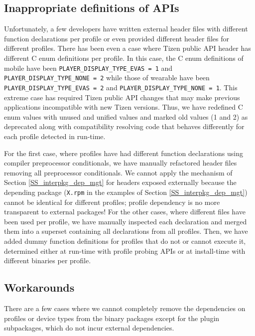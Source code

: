 \subsection{Inappropriate definitions of APIs}\label{SS_uglyAPI}

Unfortunately, a few developers have written external header files with different function declarations per profile or even provided different header files for different profiles.
There has been even a case where Tizen public API header has different C enum definitions per profile.
In this case, the C enum definitions of mobile have been \texttt{PLAYER\_DISPLAY\_TYPE\_EVAS = 1} and \texttt{PLAYER\_DISPLAY\_TYPE\_NONE = 2} while those of wearable have been \texttt{PLAYER\_DISPLAY\_TYPE\_EVAS = 2} and \texttt{PLAYER\_DISPLAY\_TYPE\_NONE = 1}.
This extreme case has required Tizen public API changes that may make previous applications incompatible with new Tizen versions.
Thus, we have redefined C enum values with unused and unified values and marked old values (1 and 2) as deprecated along with compatibility resolving code that behaves differently for each profile detected in run-time.


For the first case, where profiles have had different function declarations using compiler preprocessor conditionals, we have manually refactored header files removing all preprocessor conditionals.
We cannot apply the mechanism of Section \ref{SS_interpkg_dep_mgt} for headers exposed externally because the depending package (\texttt{X.rpm} in the examples of Section \ref{SS_interpkg_dep_mgt}) cannot be identical for different profiles; profile dependency is no more transparent to external packages!
For the other cases, where different files have been used per profile, we have manually inspected each declaration and merged them into a superset containing all declarations from all profiles.
Then, we have added dummy function definitions for profiles that do not or cannot execute it, determined either at run-time with profile probing APIs or at install-time with different binaries per profile.


\subsection{Workarounds}

There are a few cases where we cannot completely remove the dependencies on profiles or device types from the binary packages except for the plugin subpackages, which do not incur external dependencies.

